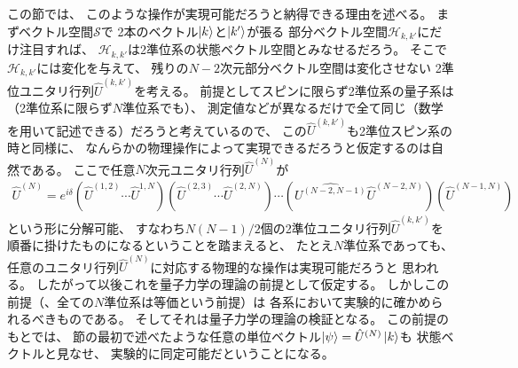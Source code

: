 \documentclass[a4paper, 10pt]{jsarticle}
\begin{document}
この節では、
このような操作が実現可能だろうと納得できる理由を述べる。
まずベクトル空間$\mathcal{S}$で
2本のベクトル$\Ket{k}$と$\Ket{k'}$が張る
部分ベクトル空間$\mathcal{H}_{k, k'}$にだけ注目すれば、
$\mathcal{H}_{k, k'}$は2準位系の状態ベクトル空間とみなせるだろう。
そこで$\mathcal{H}_{k, k'}$には変化を与えて、
残りの$N-2$次元部分ベクトル空間は変化させない
2準位ユニタリ行列$\hat{U}^{(k, k')}$を考える。
前提としてスピンに限らず2準位系の量子系は（2準位系に限らず$N$準位系でも）、
測定値などが異なるだけで全て同じ（数学を用いて記述できる）だろうと考えているので、
この$\hat{U}^{(k, k')}$も2準位スピン系の時と同様に、
なんらかの物理操作によって実現できるだろうと仮定するのは自然である。
ここで任意$N$次元ユニタリ行列$\hat{U}^{(N)}$が
\begin{align}
	\hat{U}^{(N)} = e^{i\delta}
	\left( \hat{U}^{(1, 2)} \cdots \hat{U}^{1, N} \right)
	\left( \hat{U}^{(2, 3)} \cdots \hat{U}^{(2, N)} \right) \cdots
	\left( \hat{U^{(N-2, N-1)}} \hat{U}^{(N-2, N)} \right)
	\left( \hat{U}^{(N-1, N)} \right)
	\label{分解}
\end{align}
という形に分解可能、
すなわち$N(N-1)/2$個の2準位ユニタリ行列$\hat{U}^{(k, k')}$を
順番に掛けたものになるということを踏まえると、
たとえ$N$準位系であっても、
任意のユニタリ行列$\hat{U}^{(N)}$に対応する物理的な操作は実現可能だろうと
思われる。
したがって以後これを量子力学の理論の前提として仮定する。
しかしこの前提（、全ての$N$準位系は等価という前提）は
各系において実験的に確かめられるべきものである。
そしてそれは量子力学の理論の検証となる。
この前提のもとでは、
節の最初で述べたような任意の単位ベクトル$\Ket{\psi} = \hat{U}^{(N)}\Ket{k}$も
状態ベクトルと見なせ、
実験的に同定可能だということになる。
\end{document}
